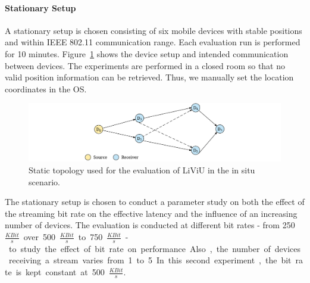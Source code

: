 \paragraph{Stationary Setup}
A stationary setup is chosen consisting of six mobile devices with stable positions and within IEEE 802.11 communication range.
Each evaluation run is performed for 10 minutes. 
Figure~\ref{fig:530_SetupNodes} shows the device setup and intended communication between devices.
The experiments are performed in a closed room so that no valid position information can be retrieved. 
Thus, we manually set the location coordinates in the \ac{OS}.

\begin{figure}[tbh!]
	\centering
	\includegraphics[width=\linewidth]{gfx/500_MobileUpload/Eval_Stationary_setup}
	\caption{Static topology used for the evaluation of LiViU in the in situ scenario.}
	\label{fig:530_SetupNodes}
\end{figure}
The stationary setup is chosen to conduct a parameter study on both the effect of the streaming bit rate on the effective latency and the influence of an increasing number of devices.
The evaluation is conducted at different bit rates - from 250 \unit{$\frac{KBit}{s}$} over 500 \unit{$\frac{KBit}{s}$} to 750 \unit{$\frac{KBit}{s}$} - to study the effect of bit rate on performance.
Also, the number of devices receiving a stream varies from 1 to 5.
In this second experiment, the bit rate is kept constant at 500 \unit{$\frac{KBit}{s}$}. 
